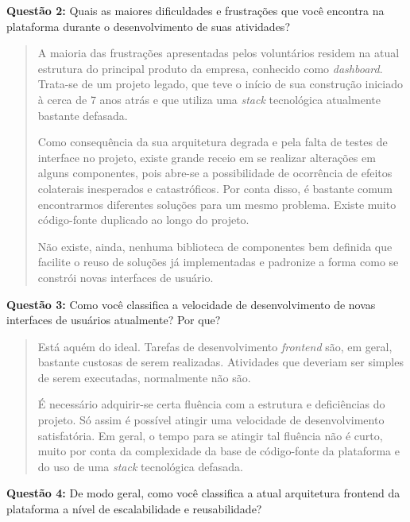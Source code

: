 \textbf{Questão 2:} Quais as maiores dificuldades e frustrações que você encontra na plataforma durante o desenvolvimento de suas atividades?

\begin{quote}
    A maioria das frustrações apresentadas pelos voluntários residem na atual estrutura do principal produto da empresa, conhecido como \textit{dashboard}. Trata-se de um projeto legado, que teve o início de sua construção iniciado à cerca de 7 anos atrás e que utiliza uma \textit{stack} tecnológica atualmente bastante defasada.
    
    Como consequência da sua arquitetura degrada e pela falta de testes de interface no projeto, existe grande receio em se realizar alterações em alguns componentes, pois abre-se a possibilidade de ocorrência de efeitos colaterais inesperados e catastróficos. Por conta disso, é bastante comum encontrarmos diferentes soluções para um mesmo problema. Existe muito código-fonte duplicado ao longo do projeto.
    
    Não existe, ainda, nenhuma biblioteca de componentes bem definida que facilite o reuso de soluções já implementadas e padronize a forma como se constrói novas interfaces de usuário.
\end{quote}

\textbf{Questão 3:} Como você classifica a velocidade de desenvolvimento de novas interfaces de usuários atualmente? Por que?

\begin{quote}
    Está aquém do ideal. Tarefas de desenvolvimento \textit{frontend} são, em geral, bastante custosas de serem realizadas. Atividades que deveriam ser simples de serem executadas, normalmente não são.
    
    É necessário adquirir-se certa fluência com a estrutura e deficiências do projeto. Só assim é possível atingir uma velocidade de desenvolvimento satisfatória. Em geral, o tempo para se atingir tal fluência não é curto, muito por conta da complexidade da base de código-fonte da plataforma e do uso de uma \textit{stack} tecnológica defasada.
\end{quote}

\textbf{Questão 4:} De modo geral, como você classifica a atual arquitetura frontend da plataforma a nível de escalabilidade e reusabilidade?

